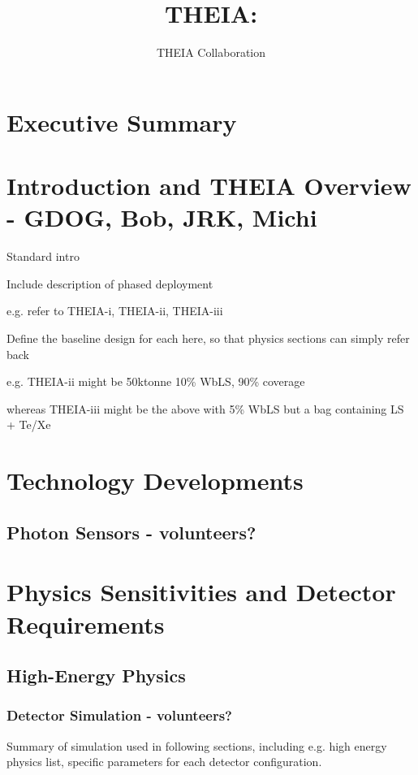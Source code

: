 \documentclass[11pt,prd,letterpaper,amsmath,amssymb,final,nofootinbib
,unsortedaddress,superscriptaddress
]{revtex4-1}
\begin{document}
\title{ THEIA: \\ {\small }}

\author{THEIA Collaboration}

\maketitle

\section*{Executive Summary}

\newpage

\tableofcontents
\setcounter{tocdepth}{5}
\newpage

\section{Introduction and THEIA Overview - GDOG, Bob, JRK, Michi}

Standard intro

Include description of phased deployment

e.g. refer to THEIA-i, THEIA-ii, THEIA-iii

Define the baseline design for each here, so that physics sections can simply refer back

e.g. THEIA-ii might be 50ktonne 10\% WbLS, 90\% coverage

whereas THEIA-iii might be the above with 5\% WbLS but a bag containing LS + Te/Xe

\section{Technology Developments}

\subsection{Photon Sensors - \bf volunteers?}



\section{Physics Sensitivities and Detector Requirements}\label{s:physics}

\subsection{High-Energy Physics}
\subsubsection{Detector Simulation - \bf volunteers?}
Summary of simulation used in following sections, including e.g. high energy physics list, specific parameters for each detector configuration.
\end{document}

